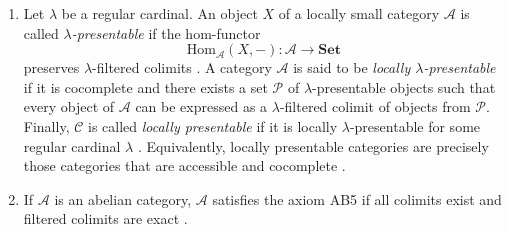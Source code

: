 \documentclass{amsproc}
\theoremstyle{definition}
\theoremstyle{plain}
\theoremstyle{remark}
\numberwithin{equation}{section}
\newcommand{\colim}{\varinjlim}
\begin{document}
\begin{enumerate}
        $$
        \hom(X, -) \colon \mathscr{A} \to \mathsf{Set}
        $$
    preserves $\lambda$-filtered colimits of monomorphisms \cite[Definition 1.67]{adamek-rosicky}. Notice that $\lambda$-filtered colimits can be replaced with $\lambda$-directed colimits, see~\cite[Theorem~1.5 and Remark~1.21]{adamek-rosicky}. In particular, $\lambda$-generated objects admit the following explicit description. An object $X \in \mathscr{A}$ is $\lambda$-generated if for every $\lambda$-directed diagram $\{u_{ij}\colon A_i\to A_j \mid i,j \in I, i\leq j\}$ of monomorphisms, with colimit cocone $\{\mu_i\colon A_i\to \colim A_i\}_{i\in I}$, the following conditions hold:
    \begin{enumerate}
    \item for every morphism $f\colon X\to \colim A_i$, there exist $i\in I$ and a morphism $f_i\colon X\to A_i$ such that $f=\mu_i f_i$;
    \item if $i,j\in I$ and $f_i\colon X\to A_i$ and $f_j\colon X\to A_j$ satisfy $\mu_i f_i=\mu_j f_j$, then there exists $k\in I$, with $i,j\leq k$, such that $u_{ik}f_i=u_{jk}f_j$.
    \end{enumerate}
    If $\lambda=\aleph_0$, we shall talk about {\em finitely generated objects}.
    \item 
    Let $\lambda$ be a regular cardinal. An object $X$ of a locally small category $\mathcal{A}$ is called {\em $\lambda$-presentable} if the hom-functor
    $$
    \mathrm{Hom}_{\mathcal{A}}(X,-) : \mathcal{A} \to \mathbf{Set}
    $$
    preserves $\lambda$-filtered colimits \cite[Definition~1.13]{adamek-rosicky}.
    A category $\mathcal{A}$ is said to be {\em locally $\lambda$-presentable} if it is cocomplete and there exists a set $\mathcal{P}$ of $\lambda$-presentable objects such that every object of $\mathcal{A}$ can be expressed as a $\lambda$-filtered colimit of objects from $\mathcal{P}$. Finally, $\mathcal{C}$ is called {\em locally presentable} if it is locally $\lambda$-presentable for some regular cardinal $\lambda$ \cite[Chapter~1]{adamek-rosicky}. Equivalently, locally presentable categories are precisely those categories that are accessible and cocomplete \cite[Corollary~2.47]{adamek-rosicky}.
    \item 
    If $\mathscr{A}$ is an abelian category, $\mathscr{A}$ satisfies the axiom AB5 if all colimits exist and filtered colimits are exact \cite[Chapter~2.8]{Popescu-abelian}.
    \end{enumerate}
\end{document}
